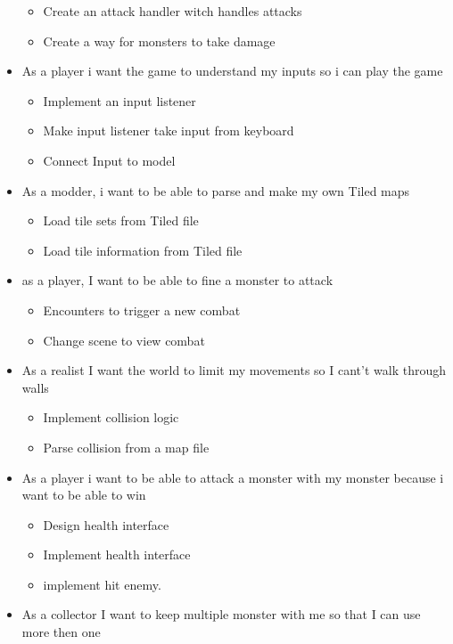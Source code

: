 \begin{itemize}
\begin{itemize}[+]
		      \item Create an attack handler witch handles attacks
		      \item Create a way for monsters to take damage
	      \end{itemize}
	\item \D As a player i want the game to understand my inputs so i can play the game
	      \begin{itemize}[+]
		      \item Implement an input listener
		      \item Make input listener take input from keyboard
		      \item Connect Input to model
	      \end{itemize}
	\item \D As a modder, i want to be able to parse and make my own Tiled maps
	      \begin{itemize}[+]
		      \item Load tile sets from Tiled file
		      \item Load tile information from Tiled file
	      \end{itemize}
	\item \D as a player, I want to be able to fine a monster to attack
	      \begin{itemize}[+]
		      \item Encounters to trigger a new combat
		      \item Change scene to view combat
	      \end{itemize}
	\item \D As a realist I want the world to limit my movements so I cant't walk through walls
	      \begin{itemize}[+]
		      \item Implement collision logic
		      \item Parse collision from a map file
	      \end{itemize}
	\item \D As a player i want to be able to attack a monster with my monster because i want to be able to win
	      \begin{itemize}[+]
		      \item Design health interface
		      \item Implement health interface
		      \item implement hit enemy.
	      \end{itemize}
	\item As a collector I want to keep multiple monster with me so that I can use more then one

\end{itemize}
